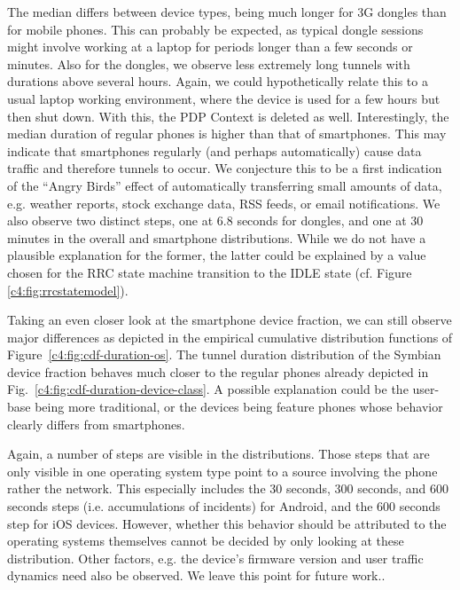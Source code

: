 The median differs between device types, being much longer for 3G dongles than for mobile phones. This can probably be expected, as typical dongle sessions might involve working at a laptop for periods longer than a few seconds or minutes. Also for the dongles, we observe less extremely long tunnels with durations above several hours. Again, we could hypothetically relate this to a usual laptop working environment, where the device is used for a few hours but then shut down. With this, the PDP Context is deleted as well. Interestingly, the median duration of regular phones is higher than that of smartphones. This may indicate that  smartphones regularly (and perhaps automatically) cause data traffic and therefore tunnels to occur. We conjecture this to be a first indication of the ``Angry Birds'' effect of automatically transferring small amounts of data, e.g. weather reports, stock exchange data, RSS feeds, or email notifications. We also observe two distinct steps, one at 6.8 seconds for dongles, and one at 30 minutes in the overall and smartphone distributions. While we do not have a plausible explanation for the former, the latter could be explained by a value chosen for the RRC state machine transition to the IDLE state (cf. Figure \ref{c4:fig:rrcstatemodel}).




Taking an even closer look at the smartphone device fraction, we can still observe major differences as depicted in the empirical cumulative distribution functions of Figure~\ref{c4:fig:cdf-duration-os}. The tunnel duration distribution of the Symbian device fraction behaves much closer to the regular phones already depicted in Fig.~\ref{c4:fig:cdf-duration-device-class}. A possible explanation could be the user-base being more traditional, or the devices being feature phones whose behavior clearly differs from smartphones.

Again, a number of steps are visible in the distributions. %
Those steps that are only visible in one operating system type point to a source involving the phone rather the network. This especially includes the 30 seconds, 300 seconds, and 600 seconds steps (i.e. accumulations of incidents) for Android, and the 600 seconds step for iOS devices. However, whether this behavior should be attributed to the operating systems themselves cannot be decided by only looking at these distribution. Other factors, e.g. the device's firmware version and user traffic dynamics need also be observed. We leave this point for future work..

